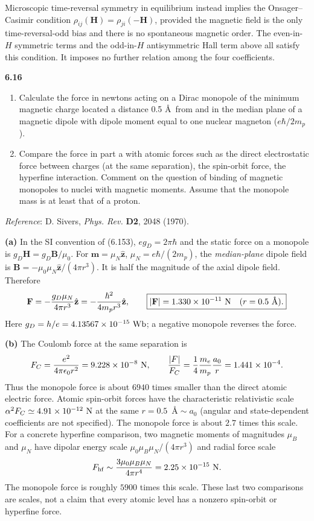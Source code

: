 Microscopic time-reversal symmetry in equilibrium instead implies the
Onsager--Casimir condition $\rho_{ij}(\mathbf H)=\rho_{ji}(-\mathbf H)$,
provided the magnetic field is the only time-reversal-odd bias and there
is no spontaneous magnetic order. The even-in-$H$ symmetric terms and
the odd-in-$H$ antisymmetric Hall term above all satisfy this condition.
It imposes no further relation among the four coefficients.

\par\bigskip
\noindent\textbf{6.16}\quad\begin{enumerate}
\item[(a)] Calculate the force in newtons acting on a Dirac monopole of the minimum magnetic charge located a distance 0.5 \AA\ from and in the median plane of a magnetic dipole with dipole moment equal to one nuclear magneton ($e\hbar/2m_{p}$).
\item[(b)] Compare the force in part a with atomic forces such as the direct electrostatic force between charges (at the same separation), the spin-orbit force, the hyperfine interaction. Comment on the question of binding of magnetic monopoles to nuclei with magnetic moments. Assume that the monopole mass is at least that of a proton.
\end{enumerate}
\emph{Reference}: D. Sivers, \emph{Phys. Rev.} \textbf{D2}, 2048 (1970).
\solution

\textbf{(a)} In the SI convention of (6.153), $eg_D=2\pi\hbar$ and the
static force on a monopole is $g_D\mathbf H=g_D\mathbf B/\mu_0$.
For $\mathbf m=\mu_N\hat{\mathbf z}$, $\mu_N=e\hbar/(2m_p)$, the
\emph{median-plane} dipole field is
$\mathbf B=-\mu_0\mu_N\hat{\mathbf z}/(4\pi r^3)$. It is half the
magnitude of the axial dipole field. Therefore
\[
\mathbf F=-\frac{g_D\mu_N}{4\pi r^3}\hat{\mathbf z}
=-\frac{\hbar^2}{4m_pr^3}\hat{\mathbf z},\qquad
\boxed{|\mathbf F|=1.330\times10^{-11}\ {\rm N}\quad(r=0.5\ \text{\AA}).}
\]
Here $g_D=h/e=4.13567\times10^{-15}\ {\rm Wb}$; a negative monopole
reverses the force.

\textbf{(b)} The Coulomb force at the same separation is
\[
F_C=\frac{e^2}{4\pi\epsilon_0r^2}=9.228\times10^{-8}\ {\rm N},\qquad
\frac{|F|}{F_C}=\frac14\frac{m_e}{m_p}\frac{a_0}{r}
=1.441\times10^{-4}.
\]
Thus the monopole force is about $6940$ times smaller than the direct
atomic electric force. Atomic spin-orbit forces have the characteristic
relativistic scale $\alpha^2F_C\simeq4.91\times10^{-12}\ {\rm N}$ at the
same $r=0.5$~\AA${}\sim a_0$ (angular and state-dependent coefficients are not specified).
The monopole force is about $2.7$ times this scale. For a concrete
hyperfine comparison, two magnetic moments of magnitudes $\mu_B$ and
$\mu_N$ have dipolar energy scale
$\mu_0\mu_B\mu_N/(4\pi r^3)$ and radial force scale
\[
F_{\rm hf}\sim\frac{3\mu_0\mu_B\mu_N}{4\pi r^4}
=2.25\times10^{-15}\ {\rm N}.
\]
The monopole force is roughly $5900$ times this scale. These last two
comparisons are scales, not a claim that every atomic level has a
nonzero spin-orbit or hyperfine force.

